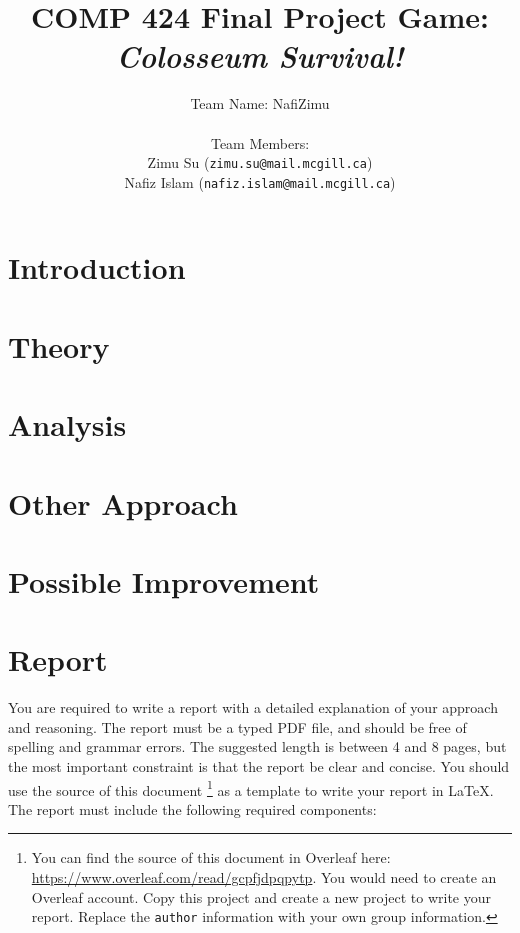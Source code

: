 \documentclass[twoside,11pt]{article}
\begin{document}
\title{COMP 424 Final Project Game: \textit{Colosseum Survival!}}
\author{Team Name: NafiZimu\\\\Team Members: \\Zimu Su (\texttt{zimu.su@mail.mcgill.ca}) \\Nafiz Islam (\texttt{nafiz.islam@mail.mcgill.ca})}

\maketitle

\section{Introduction}

\section{Theory}

\section{Analysis}

\section{Other Approach}

\section{Possible Improvement}

\section{Report}

You are required to write a report with a detailed explanation of your approach and reasoning. The report must be a typed PDF file, and should be free of spelling and grammar errors. The suggested length is between 4 and 8 pages, but the most important constraint is that the report be clear and concise. You should use the source of this document \footnote{You can find the source of this document in Overleaf here: \href{https://www.overleaf.com/read/gcpfjdpqpytp}{https://www.overleaf.com/read/gcpfjdpqpytp}. You would need to create an Overleaf account. Copy this project and create a new project to write your report. Replace the \texttt{author} information with your own group information.} as a template to write your report in \LaTeX.  The report must include the following required components:
\end{document}
